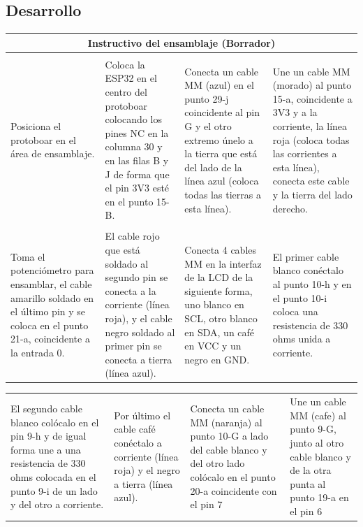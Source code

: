 \subsection{Desarrollo}
\begin{center}
    
\begin{tabular}{ |p{4cm}|p{4cm}|p{4cm}|p{4cm}| }
\hline
\multicolumn{4}{|c|}{\textbf{Instructivo del ensamblaje (Borrador) }} \\
\hline
  & & & \\

\hline
 Posiciona el protoboar en el área de ensamblaje. 
 & Coloca la ESP32 en el centro del protoboar colocando los pines NC en la columna 30 y en las filas B y J de forma que el pin 3V3 esté en el punto 15-B. 
 &  Conecta un cable MM (azul) en el punto 29-j coincidente al pin G y el otro extremo únelo a la tierra que está del lado de la línea azul (coloca todas las tierras a esta línea).
 & Une un cable MM (morado) al punto 15-a, coincidente a 3V3 y a la corriente, la línea roja (coloca todas las corrientes a esta línea), conecta este cable y la tierra del lado derecho. \\
 
\hline

&&&\\

\hline
 Toma el potenciómetro para ensamblar, el cable amarillo soldado en el último pin y se coloca en el punto 21-a, coincidente a la entrada 0.
 &  El cable rojo que está soldado al segundo pin se conecta a la corriente (línea roja), y el cable negro soldado al primer pin se conecta a tierra (línea azul). 
 & Conecta 4 cables MM en la interfaz de la LCD de la siguiente forma, uno blanco en SCL, otro blanco en SDA, un café en VCC y un negro en GND. 
 & El primer cable blanco conéctalo al punto 10-h y en el punto 10-i coloca una resistencia de 330 ohms unida a corriente.\\
\hline

\end{tabular}

\begin{tabular}{ |p{4cm}|p{4cm}|p{4cm}|p{4cm}| }
\hline
  & & & \\

\hline
 El segundo cable blanco colócalo en el pin 9-h y de igual forma une a una resistencia de 330 ohms colocada en el punto 9-i de un lado y del otro a corriente. 
 & Por último el cable café conéctalo a corriente (línea roja) y el negro a tierra (línea azul). 
 & Conecta un cable MM (naranja) al punto 10-G a lado del cable blanco y del otro lado colócalo en el punto 20-a coincidente con el pin 7
 & Une un cable MM (cafe) al punto 9-G, junto al otro cable blanco y de la otra punta al punto 19-a en el pin 6  \\
 

\end{tabular}
\end{center}

